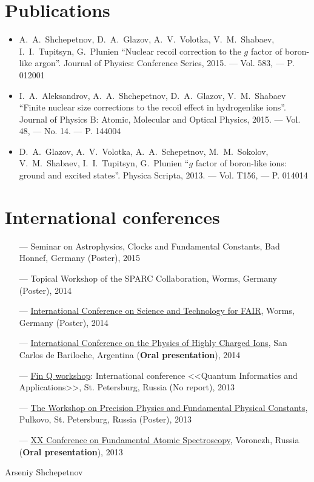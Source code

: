 \documentclass[10pt,a4paper]{article}
\newcommand{\verticalSpace}{0.3cm}
\begin{document}
	
	\section*{Publications}
	\begin{itemize}
		\item A.~A.~Shchepetnov, D.~A.~Glazov, A.~V.~Volotka, V.~M.~Shabaev, I.~I.~Tupitsyn, G.~Plunien 
			``Nuclear recoil correction to the $g$ factor of boron-like argon''. Journal of Physics: Conference Series, 2015. --- Vol. 583, --- P. 012001
		\item I.~A.~Aleksandrov, A.~A.~Shchepetnov, D.~A.~Glazov, V.~M.~Shabaev 
			``Finite nuclear size corrections to the recoil effect in hydrogenlike ions''. Journal of Physics B: Atomic, Molecular and Optical Physics, 2015. --- Vol. 48, --- No. 14. --- P. 144004		
		\item D.~A.~Glazov, A.~V.~Volotka, A.~A.~Schepetnov, M.~M.~Sokolov, V.~M.~Shabaev, I.~I.~Tupitsyn, G.~Plunien 
			``$g$ factor of boron-like ions: ground and excited states''. Physica Scripta, 2013. --- Vol. T156, --- P. 014014
	\end{itemize}
	\section*{International conferences}
		\begin{itemize}
			\item[---]	Seminar on Astrophysics, Clocks and Fundamental Constants, Bad Honnef, Germany (Poster), 2015
			\item[---]	Topical Workshop of the SPARC Collaboration, Worms, Germany (Poster), 2014
			\item[---]	\href{http://indico.gsi.de/conferenceDisplay.py?confId=2443}{International Conference on Science and Technology for FAIR}, Worms, Germany (Poster), 2014
			\item[---]	\href{http://www.cab.cnea.gov.ar/hci2014/}{International Conference on the Physics of Highly Charged Ions}, San Carlos de Bariloche, Argentina (\textbf{Oral presentation}), 2014
			\item[---]	\href{https://sites.google.com/site/finqinternational/home}{Fin Q workshop}: International conference <<Quantum Informatics and Applications>>, St. Petersburg, Russia (No report), 2013
			\item[---]	\href{http://www.gao.spb.ru/russian/psas/ffk2013/}{The Workshop on Precision Physics and Fundamental Physical Constants}, Pulkovo, St. Petersburg, Russia (Poster), 2013
			\item[---]	\href{http://fas.vsu.ru/en/index.php}{XX Conference on Fundamental Atomic Spectroscopy}, Voronezh, Russia (\textbf{Oral presentation}), 2013
		\end{itemize}		
	
	\vspace{5cm}
	
	Arseniy Shchepetnov
	
	
	
	
\end{document}
